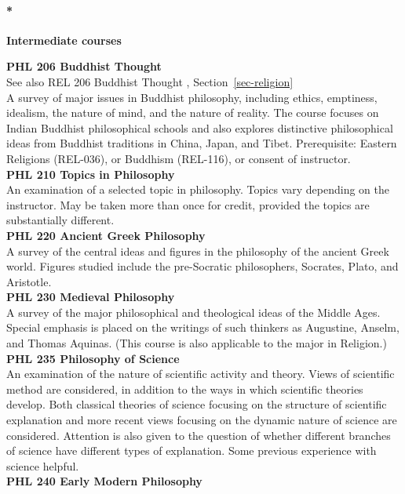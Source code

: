 \documentclass[
  letterpaper,
]{scrbook}
\let\oldparagraph\paragraph
\renewcommand{\paragraph}[1]{\oldparagraph{#1}\mbox{}}
\begin{document}
\paragraph*{\texorpdfstring{\textbf{Intermediate
courses}}{Intermediate courses}}\label{intermediate-courses}

\textbf{PHL 206 Buddhist Thought}\\
See also REL 206 Buddhist Thought , Section~\ref{sec-religion}\\
A survey of major issues in Buddhist philosophy, including ethics,
emptiness, idealism, the nature of mind, and the nature of reality. The
course focuses on Indian Buddhist philosophical schools and also
explores distinctive philosophical ideas from Buddhist traditions in
China, Japan, and Tibet. Prerequisite: Eastern Religions (REL-036), or
Buddhism (REL-116), or consent of instructor.\\
\textbf{PHL 210 Topics in Philosophy}\\
An examination of a selected topic in philosophy. Topics vary depending
on the instructor. May be taken more than once for credit, provided the
topics are substantially different.\\
\textbf{PHL 220 Ancient Greek Philosophy}\\
A survey of the central ideas and figures in the philosophy of the
ancient Greek world. Figures studied include the pre-Socratic
philosophers, Socrates, Plato, and Aristotle.\\
\textbf{PHL 230 Medieval Philosophy}\\
A survey of the major philosophical and theological ideas of the Middle
Ages. Special emphasis is placed on the writings of such thinkers as
Augustine, Anselm, and Thomas Aquinas. (This course is also applicable
to the major in Religion.)\\
\textbf{PHL 235 Philosophy of Science}\\
An examination of the nature of scientific activity and theory. Views of
scientific method are considered, in addition to the ways in which
scientific theories develop. Both classical theories of science focusing
on the structure of scientific explanation and more recent views
focusing on the dynamic nature of science are considered. Attention is
also given to the question of whether different branches of science have
different types of explanation. Some previous experience with science
helpful.\\
\textbf{PHL 240 Early Modern Philosophy}\\
\end{document}
